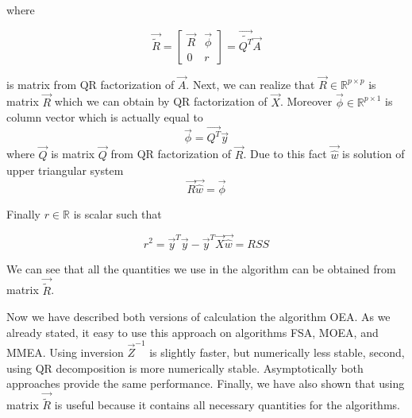 where 

\begin{equation}
    \vec{\tilde{R}} = 
    \begin{bmatrix}
        \vec{R} & \vec{\phi} \\
     0 & r
    \end{bmatrix} 
    = \vec{\tilde{Q^T}}\vec{A}
\end{equation}

is matrix from QR factorization of $\vec{A}$. 
Next, we can realize that $\vec{R} \in \mathbb{R}^{p \times p}$ is matrix $\vec{R}$ which we can obtain by QR factorization of $\vec{X}$. 
Moreover $\vec{\phi} \in \mathbb{R}^{p \times 1}$ is column vector which is actually equal to
\begin{equation}
    \vec{\phi} =  \vec{Q^T}\vec{y}
\end{equation}
where $\vec{Q}$ is matrix $\vec{Q}$ from QR factorization of $\vec{R}$.
Due to this fact $\vec{\hat{w}}$ is solution of upper triangular system 
\begin{equation}
    \vec{R}\vec{\hat{w}} = \vec{\phi}
\end{equation}

Finally $r \in \mathbb{R}$ is scalar such that 

\begin{equation}
    r^2 = \vec{y}^T\vec{y} - \vec{y}^T\vec{X}\vec{\hat{w}} = RSS
\end{equation}

\begin{remark} \label{qnotrequiredspeedupremark}
    We can see that all the quantities we use in the algorithm can be obtained from matrix $\vec{\tilde{R}}$.
\end{remark}

Now we have described both versions of calculation the algorithm OEA. As we already stated, it easy to use this approach on algorithms FSA, MOEA, and MMEA. Using inversion $\vec{Z}^{-1}$ is slightly faster, but numerically less stable, second, using QR decomposition is more numerically stable. Asymptotically both approaches provide the same performance. Finally, we have also shown that using matrix $\vec{\tilde{R}}$ is useful because it contains all necessary quantities for the algorithms.









